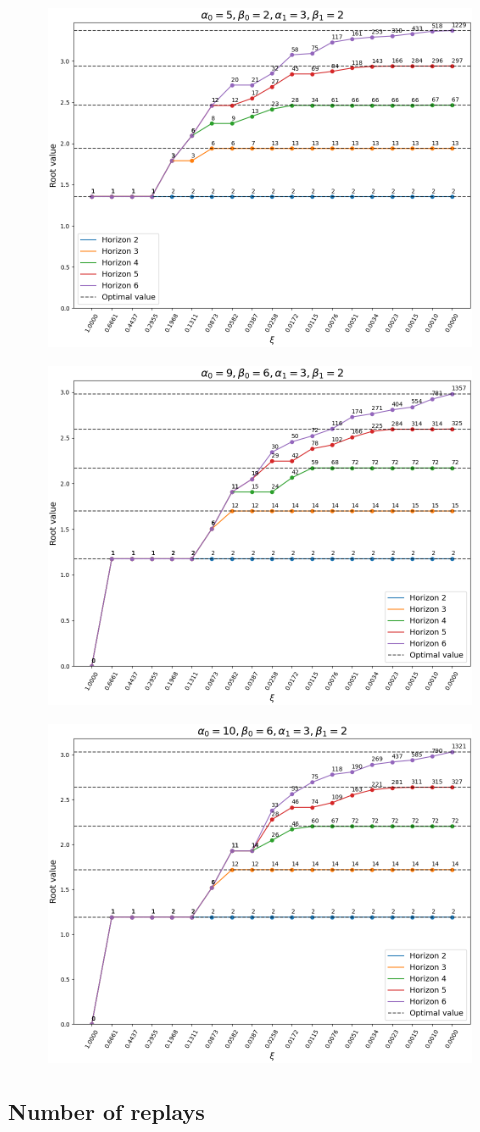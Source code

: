 \documentclass{article}
\begin{document}
\begin{figure}[h!]
    \centering
    \includegraphics[width=.75\textwidth]{../data/convergence/xi/alpha05_beta02_alpha13_beta12.png}
\end{figure}

\begin{figure}[h!]
    \centering
    \includegraphics[width=.75\textwidth]{../data/convergence/xi/alpha09_beta06_alpha13_beta12.png}
\end{figure}

\begin{figure}[h!]
    \centering
    \includegraphics[width=.75\textwidth]{../data/convergence/xi/alpha010_beta06_alpha13_beta12.png}
\end{figure}

\newpage

\subsection*{Number of replays}
\end{document}
